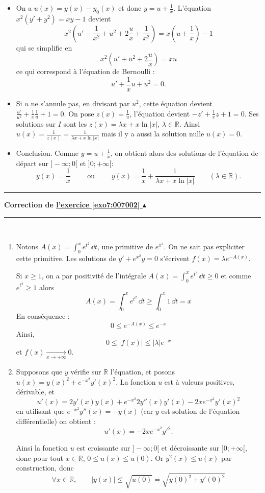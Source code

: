 \documentclass[11pt,a4paper]{article}
\newcommand{\Rr}{\mathbb{R}} \newcommand{\R}{\mathbb{R}}
\renewcommand{\ge}{\geqslant} \renewcommand{\geq}{\geqslant}
\renewcommand{\le}{\leqslant} \renewcommand{\leq}{\leqslant}
\newcounter{exo}
\newcommand{\correction}[1]{\hypertarget{cor7:#1}{}\label{cor7:#1}{\bf Correction de \hyperlink{exo7:#1}{l'exercice \ref{exo7:#1} $\blacktriangle$}}\vspace{1mm}\hrule\vspace{1mm}}
\newcommand{\fincorrection}{\vspace{1mm}\hrule\vspace*{7mm}}
\begin{document}
\begin{enumerate}
\begin{enumerate}
\begin{itemize}
      \item On a $u(x) = y(x)-y_0(x)$ et donc $y = u + \frac1x$.
      L'équation $x^2(y'+y^2) = xy-1$ devient 
      $$x^2 \left( u'-\frac{1}{x^2} + u^2 + 2\frac{u}{x} + \frac{1}{x^2} \right) = x\left(u+\frac1x\right)-1$$
      qui se simplifie en
      $$x^2 \left( u' + u^2 + 2\frac{u}{x}  \right) = xu$$
      ce qui correspond à l'équation de Bernoulli :
      $$u'+\frac{1}{x}u+u^2 = 0.$$
      
      \item Si $u$ ne s'annule pas, en divisant par $u^2$, cette équation devient 
      $\frac{u'}{u^2} + \frac{1}{x}\frac{1}{u} + 1 =0$.
      On pose $z(x) = \frac{1}{u}$, l'équation devient
      $-z'+\frac1x z+1 =0$.
      Ses solutions sur $I$ sont les $z(x) = \lambda x + x\ln |x|$, $\lambda \in \Rr$.
      Ainsi $u(x) = \frac{1}{z(x)} = \frac1{\lambda x + x\ln |x|}$ mais il y a aussi la solution nulle $u(x)= 0$.
      
      \item Conclusion. Comme $y = u + \frac1x$, on obtient alors des solutions de l'équation de départ sur $]-\infty;0[$ et $]0;+\infty[$:
      $$y(x) = \frac1x \qquad \text{ ou } \qquad y(x) = \frac1x +  \frac1{\lambda x + x\ln |x|} \qquad (\lambda \in \Rr).$$
    \end{itemize}

  \end{enumerate}
  \end{enumerate}  
\fincorrection
\correction{007002}
\ \begin{enumerate}
\item 
Notons $A(x) = \int_0^xe^{t^2}\,\dd t$, une primitive de $e^{x^2}$.
On ne sait pas expliciter cette primitive.
Les solutions de $y'+e^{x^2}y=0$ s'écrivent 
$f(x)=\lambda e^{-A(x)}$. 

Si $x\ge 1$, on a par positivité de l'intégrale $A(x) = \int_0^xe^{t^2}\,\dd t\ge 0$ et 
comme $e^{t^2} \ge 1$ alors 
$$A(x) = \int_0^xe^{t^2}\,\dd t \ge \int_0^x 1 \,\dd t = x$$
En conséquence :
$$0 \le e^{-A(x)} \le e^{-x}$$
Ainsi, 
$$0\le |f(x)|\le |\lambda|e^{-x}$$ et $f(x)\xrightarrow[x\to +\infty]{}0$.

\item Supposons que $y$ vérifie sur $\R$ l'équation, et 
posons $u(x)=y(x)^2+e^{-x^2}y'(x)^2$. La fonction $u$ est à valeurs positives, 
dérivable, et 
$$u'(x) = 2y'(x)y(x)+e^{-x^2}2y''(x)y'(x)-2xe^{-x^2}y'(x)^2$$
en utilisant que $e^{-x^2}y''(x) = -y(x)$ 
(car $y$ est solution de l'équation différentielle) on obtient :
$$u'(x)=-2xe^{-x^2}y'^2.$$ 

Ainsi la fonction $u$ est croissante sur $]-\infty;0[$ 
et décroissante sur $]0;+\infty[$, donc pour tout $x\in\R$, $0 \le u(x)\le u(0)$. 
Or $y^2(x)\le u(x)$ par construction, donc
$$\forall x\in\R,\qquad |y(x)|\le \sqrt{u(0)}=\sqrt{y(0)^2+y'(0)^2}$$
\end{enumerate}
\end{document}
